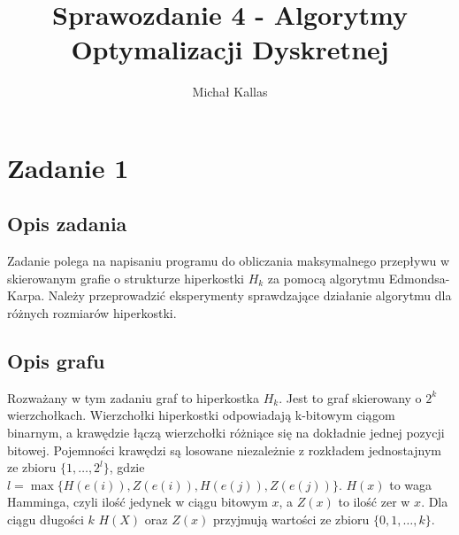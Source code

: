 \documentclass{article}
\title{Sprawozdanie 4 - Algorytmy Optymalizacji Dyskretnej}
\author{Michał Kallas}
\begin{document}
\maketitle

\section{Zadanie 1}
\subsection{Opis zadania}
Zadanie polega na napisaniu programu do obliczania maksymalnego przepływu w skierowanym grafie o strukturze hiperkostki $H_k$ za pomocą algorytmu Edmondsa-Karpa.
Należy przeprowadzić eksperymenty sprawdzające działanie algorytmu dla różnych rozmiarów hiperkostki.

\subsection{Opis grafu}
Rozważany w tym zadaniu graf to hiperkostka $H_k$.
Jest to graf skierowany o $2^k$ wierzchołkach.
Wierzchołki hiperkostki odpowiadają k-bitowym ciągom binarnym, a krawędzie łączą wierzchołki różniące się na dokładnie jednej pozycji bitowej.
Pojemności krawędzi są losowane niezależnie z rozkładem jednostajnym ze zbioru $\{1, \dots, 2^l\}$, gdzie $l = \max\{H(e(i)), Z(e(i)), H(e(j)), Z(e(j))\}$.
$H(x)$ to waga Hamminga, czyli ilość jedynek w ciągu bitowym $x$, a $Z(x)$ to ilość zer w $x$.
Dla ciągu długości $k$ $H(X)$ oraz $Z(x)$ przyjmują wartości ze zbioru $\{0, 1, \dots, k\}$.
\end{document}
